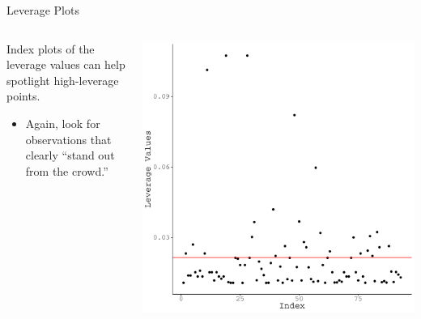 \documentclass{beamer}\usepackage[]{graphicx}\usepackage[]{color}
\makeatletter
\def\maxwidth{ %
  \ifdim\Gin@nat@width>\linewidth
    \linewidth
  \else
    \Gin@nat@width
  \fi
}
\newenvironment{knitrout}{}{} %
\makeatother
\begin{document}
\begin{frame}{Leverage Plots}
  
  \begin{columns}
    \begin{column}{0.5\textwidth}
      
      Index plots of the leverage values can help spotlight high-leverage points.
      \vb
      \begin{itemize}
      \item Again, look for observations that clearly ``stand out from the 
        crowd.''
      \end{itemize}
      
    \end{column}
    
    \begin{column}{0.5\textwidth}
\begin{knitrout}\footnotesize
{}\color{fgcolor}

{\centering \includegraphics[width=\maxwidth]{figure/unnamed-chunk-29-1} 

}



\end{knitrout}

\end{column}
\end{columns}

\end{frame}
\end{document}
